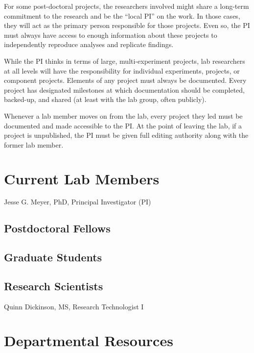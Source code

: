\documentclass[
]{book}
\begin{document}
For some post-doctoral projects, the researchers involved might share a long-term commitment to the research and be the ``local PI'' on the work. In those cases, they will act as the primary person responsible for those projects. Even so, the PI must always have access to enough information about these projects to independently reproduce analyses and replicate findings.

While the PI thinks in terms of large, multi-experiment projects, lab researchers at all levels will have the responsibility for individual experiments, projects, or component projects. Elements of any project must always be documented. Every project has designated milestones at which documentation should be completed, backed-up, and shared (at least with the lab group, often publicly).

Whenever a lab member moves on from the lab, every project they led must be documented and made accessible to the PI. At the point of leaving the lab, if a project is unpublished, the PI must be given full editing authority along with the former lab member.

\hypertarget{current-lab-members}{%
\section{Current Lab Members}\label{current-lab-members}}

Jesse G. Meyer, PhD, Principal Investigator (PI)

\hypertarget{postdoctoral-fellows}{%
\subsection{Postdoctoral Fellows}\label{postdoctoral-fellows}}

\hypertarget{graduate-students}{%
\subsection{Graduate Students}\label{graduate-students}}

\hypertarget{research-scientists}{%
\subsection{Research Scientists}\label{research-scientists}}

Quinn Dickinson, MS, Research Technologist I

\hypertarget{departmental-resources}{%
\section{Departmental Resources}\label{departmental-resources}}
\end{document}
